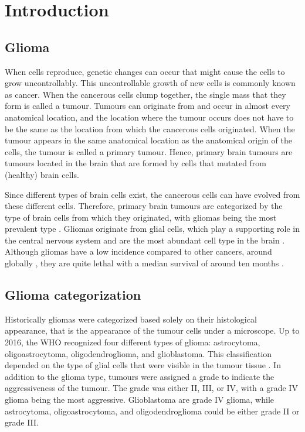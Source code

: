 
\chapter{Introduction}

\section{Glioma}

When cells reproduce, genetic changes can occur that might cause the cells to grow uncontrollably.
This uncontrollable growth of new cells is commonly known as cancer.
When the cancerous cells clump together, the single mass that they form is called a tumour.
Tumours can originate from and occur in almost every anatomical location, and the location where the tumour occurs does not have to be the same as the location from which the cancerous cells originated.
When the tumour appears in the same anatomical location as the anatomical origin of the cells, the tumour is called a primary tumour.
Hence, primary brain tumours are tumours located in the brain that are formed by cells that mutated from (healthy) brain cells.

Since different types of brain cells exist, the cancerous cells can have evolved from these different cells.
Therefore, primary brain tumours are categorized by the type of brain cells from which they originated, with gliomas being the most prevalent type \autocite{leece2017indicence}.
Gliomas originate from glial cells, which play a supporting role in the central nervous system and are the most abundant cell type in the brain \autocite{jakel2017glial}.
Although gliomas have a low incidence compared to other cancers, around  globally \autocite{leece2017indicence}, they are quite lethal with a median survival of around ten months \autocite{hess2004gliomaincidence}.

\section{Glioma categorization}
Historically gliomas were categorized based solely on their histological appearance, that is the appearance of the tumour cells under a microscope.
Up to 2016, the \gls{WHO} recognized four different types of glioma: astrocytoma, oligoastrocytoma, oligodendroglioma, and glioblastoma.
This classification depended on the type of glial cells that were visible in the tumour tissue \autocite{louis2007who}.
In addition to the glioma type, tumours were assigned a grade to indicate the aggressiveness of the tumour.
The grade was either II, III, or IV, with a grade IV glioma being the most aggressive.
Glioblastoma are grade IV glioma, while astrocytoma, oligoastrocytoma, and oligodendroglioma could be either grade II or grade III.

